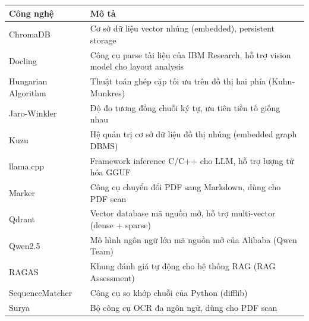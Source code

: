 \documentclass[12pt, a4paper]{report}
\begin{document}
\begin{longtable}{p{3cm} p{10cm}}
    \hline
    \textbf{Công nghệ} & \textbf{Mô tả}\\
    \hline
    ChromaDB & Cơ sở dữ liệu vector nhúng (embedded), persistent storage\\
    Docling & Công cụ parse tài liệu của IBM Research, hỗ trợ vision model cho layout analysis\\
    Hungarian Algorithm & Thuật toán ghép cặp tối ưu trên đồ thị hai phía (Kuhn-Munkres)\\
    Jaro-Winkler & Độ đo tương đồng chuỗi ký tự, ưu tiên tiền tố giống nhau\\
    Kuzu & Hệ quản trị cơ sở dữ liệu đồ thị nhúng (embedded graph DBMS)\\
    llama.cpp & Framework inference C/C++ cho LLM, hỗ trợ lượng tử hóa GGUF\\
    Marker & Công cụ chuyển đổi PDF sang Markdown, dùng cho PDF scan\\
    Qdrant & Vector database mã nguồn mở, hỗ trợ multi-vector (dense + sparse)\\
    Qwen2.5 & Mô hình ngôn ngữ lớn mã nguồn mở của Alibaba (Qwen Team)\\
    RAGAS & Khung đánh giá tự động cho hệ thống RAG (RAG Assessment)\\
    SequenceMatcher & Công cụ so khớp chuỗi của Python (difflib)\\
    Surya & Bộ công cụ OCR đa ngôn ngữ, dùng cho PDF scan\\
    \hline
\end{longtable}
\newpage

\renewcommand{\listfigurename}{DANH MỤC HÌNH ẢNH}
\listoffigures
{}
\newpage

\renewcommand{\listtablename}{DANH MỤC BẢNG}
\listoftables
{}
\newpage














\end{document}
